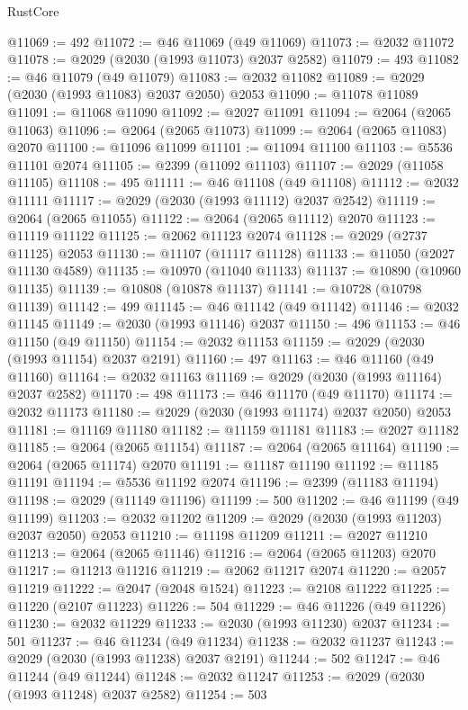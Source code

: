 \begin{lexlean}{RustCore}
\begin{coremodule}
@11069 := 492
@11072 := @46 @11069 (@49 @11069)
@11073 := @2032 @11072
@11078 := @2029 (@2030 (@1993 @11073) @2037 @2582)
@11079 := 493
@11082 := @46 @11079 (@49 @11079)
@11083 := @2032 @11082
@11089 := @2029 (@2030 (@1993 @11083) @2037 @2050) @2053
@11090 := @11078 @11089
@11091 := @11068 @11090
@11092 := @2027 @11091
@11094 := @2064 (@2065 @11063)
@11096 := @2064 (@2065 @11073)
@11099 := @2064 (@2065 @11083) @2070
@11100 := @11096 @11099
@11101 := @11094 @11100
@11103 := @5536 @11101 @2074
@11105 := @2399 (@11092 @11103)
@11107 := @2029 (@11058 @11105)
@11108 := 495
@11111 := @46 @11108 (@49 @11108)
@11112 := @2032 @11111
@11117 := @2029 (@2030 (@1993 @11112) @2037 @2542)
@11119 := @2064 (@2065 @11055)
@11122 := @2064 (@2065 @11112) @2070
@11123 := @11119 @11122
@11125 := @2062 @11123 @2074
@11128 := @2029 (@2737 @11125) @2053
@11130 := @11107 (@11117 @11128)
@11133 := @11050 (@2027 @11130 @4589)
@11135 := @10970 (@11040 @11133)
@11137 := @10890 (@10960 @11135)
@11139 := @10808 (@10878 @11137)
@11141 := @10728 (@10798 @11139)
@11142 := 499
@11145 := @46 @11142 (@49 @11142)
@11146 := @2032 @11145
@11149 := @2030 (@1993 @11146) @2037
@11150 := 496
@11153 := @46 @11150 (@49 @11150)
@11154 := @2032 @11153
@11159 := @2029 (@2030 (@1993 @11154) @2037 @2191)
@11160 := 497
@11163 := @46 @11160 (@49 @11160)
@11164 := @2032 @11163
@11169 := @2029 (@2030 (@1993 @11164) @2037 @2582)
@11170 := 498
@11173 := @46 @11170 (@49 @11170)
@11174 := @2032 @11173
@11180 := @2029 (@2030 (@1993 @11174) @2037 @2050) @2053
@11181 := @11169 @11180
@11182 := @11159 @11181
@11183 := @2027 @11182
@11185 := @2064 (@2065 @11154)
@11187 := @2064 (@2065 @11164)
@11190 := @2064 (@2065 @11174) @2070
@11191 := @11187 @11190
@11192 := @11185 @11191
@11194 := @5536 @11192 @2074
@11196 := @2399 (@11183 @11194)
@11198 := @2029 (@11149 @11196)
@11199 := 500
@11202 := @46 @11199 (@49 @11199)
@11203 := @2032 @11202
@11209 := @2029 (@2030 (@1993 @11203) @2037 @2050) @2053
@11210 := @11198 @11209
@11211 := @2027 @11210
@11213 := @2064 (@2065 @11146)
@11216 := @2064 (@2065 @11203) @2070
@11217 := @11213 @11216
@11219 := @2062 @11217 @2074
@11220 := @2057 @11219
@11222 := @2047 (@2048 @1524)
@11223 := @2108 @11222
@11225 := @11220 (@2107 @11223)
@11226 := 504
@11229 := @46 @11226 (@49 @11226)
@11230 := @2032 @11229
@11233 := @2030 (@1993 @11230) @2037
@11234 := 501
@11237 := @46 @11234 (@49 @11234)
@11238 := @2032 @11237
@11243 := @2029 (@2030 (@1993 @11238) @2037 @2191)
@11244 := 502
@11247 := @46 @11244 (@49 @11244)
@11248 := @2032 @11247
@11253 := @2029 (@2030 (@1993 @11248) @2037 @2582)
@11254 := 503

\end{coremodule}
\end{lexlean}
